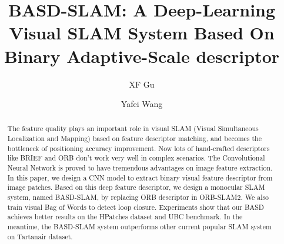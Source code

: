 \documentclass{svproc}
\begin{document}
\mainmatter              %
%
\title{BASD-SLAM: A Deep-Learning Visual SLAM System Based On Binary Adaptive-Scale descriptor}
%
%
\author{XF Gu \and Yafei Wang}
%
%
%


\maketitle              %


\begin{abstract}
The feature quality plays an important role in visual SLAM (Visual Simultaneous Localization and Mapping) based on feature descriptor matching, and becomes the bottleneck of positioning accuracy improvement. Now lots of hand-crafted descriptors like BRIEF and ORB don't work very well in complex scenarios. The Convolutional Neural Network is proved to have tremendous advantages on image feature extraction. In this paper, we design a CNN model to extract binary visual feature descriptor from image patches. Based on this deep feature descriptor, we design a monocular SLAM system, named BASD-SLAM, by replacing ORB descriptor in ORB-SLAM2. We also train visual Bag of Words to detect loop closure. Experiments show that our BASD achieves better results on the HPatches dataset and UBC benchmark. In the meantime, the BASD-SLAM system outperforms other current popular SLAM system on Tartanair dataset.

\end{abstract}






\end{document}
